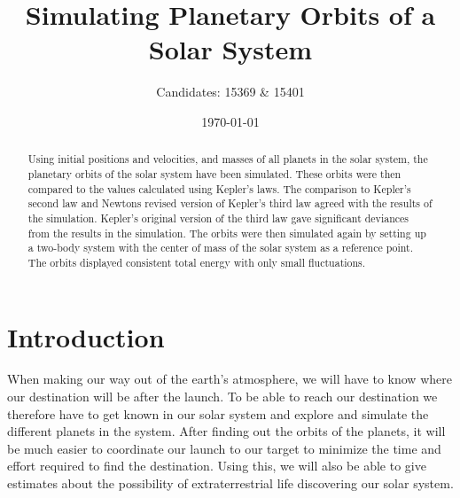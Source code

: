 \documentclass[reprint,english,notitlepage]{revtex4-2}
\begin{document}
\title{Simulating Planetary Orbits of a Solar System}
\author{Candidates: 15369 \& 15401}
\date{\today}

\begin{abstract}
	Using initial positions and velocities, and masses of all planets in the solar system, the planetary orbits of the solar system have been simulated.
	These orbits were then compared to the values calculated using Kepler's laws.
	The comparison to Kepler's second law and Newtons revised version of Kepler's third law agreed with the results of the simulation.
	Kepler's original version of the third law gave significant deviances from the results in the simulation.
	The orbits were then simulated again by setting up a two-body system with the center of mass of the solar system as a reference point.
	The orbits displayed consistent total energy with only small fluctuations.
\end{abstract}
\maketitle

\section{Introduction}
When making our way out of the earth's atmosphere, we will have to know where our destination will be after the launch.
To be able to reach our destination we therefore have to get known in our solar system and explore and simulate the different planets in the system.
After finding out the orbits of the planets, it will be much easier to coordinate our launch to our target to minimize the time and effort required to find the destination.
Using this, we will also be able to give estimates about the possibility of extraterrestrial life discovering our solar system.
\end{document}
